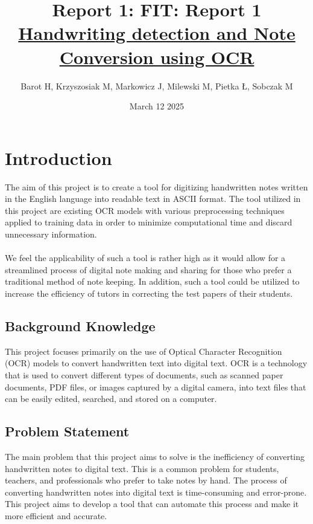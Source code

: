 \documentclass[twoside,a4paper]{article}
\title{Report 1: }
\title{\textbf{FIT: Report 1} \\[1ex] \Large \underline{Handwriting detection and Note Conversion using OCR}
}
\author{Barot H, Krzyszosiak M, Markowicz J, Milewski M, Pietka Ł, Sobczak M}
\date{March 12 2025}
\begin{document}
\maketitle
\tableofcontents
\newpage
\section{Introduction}
The aim of this project is to create a tool for digitizing handwritten notes written in the English language into readable text in ASCII format. The tool utilized in this project are existing OCR models with various preprocessing techniques applied to training data in order to minimize computational time and discard unnecessary information. \\\\
We feel the applicability of such a tool is rather high as it would allow for a streamlined process of digital note making and sharing for those who prefer a traditional method of note keeping. In addition, such a tool could be utilized to increase the efficiency of tutors in correcting the test papers of their students.

\subsection{Background Knowledge}
This project focuses primarily on the use of Optical Character Recognition (OCR) models to convert handwritten text into digital text. 
OCR is a technology that is used to convert different types of documents, such as scanned paper documents, PDF files, or images captured by a digital camera, into text files that can be easily edited, searched, and stored on a computer.\\




\subsection{Problem Statement}
The main problem that this project aims to solve is the inefficiency of converting handwritten notes to digital text. 
This is a common problem for students, teachers, and professionals who prefer to take notes by hand. 
The process of converting handwritten notes into digital text is time-consuming and error-prone. 
This project aims to develop a tool that can automate this process and make it more efficient and accurate. \\
 
\end{document}
